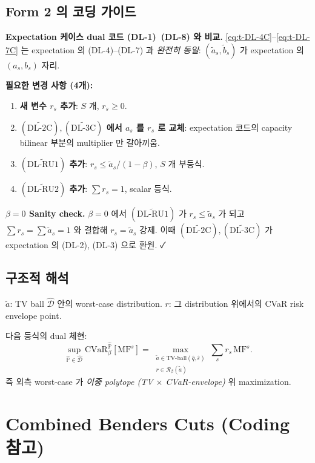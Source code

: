 \documentclass[11pt]{article}
\newcommand{\Phat}{\hat{\mathbb{P}}}
\newcommand{\Dhat}{\hat{\mathcal{D}}}
\newcommand{\hatq}{\hat{q}}
\newcommand{\MF}{\mathrm{MF}}
\newcommand{\CVaR}{\mathrm{CVaR}}
\newcommand{\Rb}{\mathcal{R}_\beta}
\theoremstyle{plain}
\theoremstyle{remark}
\begin{document}
\subsection{Form 2 의 코딩 가이드}

\textbf{Expectation 케이스 dual 코드 (DL-1)~(DL-8) 와 비교.}
\eqref{eq:t-DL-4C}--\eqref{eq:t-DL-7C} 는 expectation 의 (DL-4)--(DL-7) 과 \emph{완전히 동일}:
$(\tilde a_s, \tilde b_s)$ 가 expectation 의 $(a_s, b_s)$ 자리.

\textbf{필요한 변경 사항 (4개):}
\begin{enumerate}[leftmargin=*]
\item \textbf{새 변수 $r_s$ 추가}: $S$ 개, $r_s \geq 0$.
\item \textbf{$(\widetilde{\text{DL-2C}}), (\widetilde{\text{DL-3C}})$ 에서 $a_s$ 를 $r_s$ 로 교체}: expectation 코드의 capacity bilinear 부분의 multiplier 만 갈아끼움.
\item \textbf{$(\widetilde{\text{DL-RU1}})$ 추가}: $r_s \leq \tilde a_s/(1-\beta)$, $S$ 개 부등식.
\item \textbf{$(\widetilde{\text{DL-RU2}})$ 추가}: $\sum r_s = 1$, scalar 등식.
\end{enumerate}

\textbf{$\beta = 0$ Sanity check.} $\beta = 0$ 에서 $(\widetilde{\text{DL-RU1}})$ 가 $r_s \leq \tilde a_s$ 가 되고 $\sum r_s = \sum \tilde a_s = 1$ 와 결합해 $r_s = \tilde a_s$ 강제. 이때 $(\widetilde{\text{DL-2C}}), (\widetilde{\text{DL-3C}})$ 가 expectation 의 (DL-2), (DL-3) 으로 환원. ✓

\subsection{구조적 해석}

\textbf{$\tilde a$}: TV ball $\Dhat$ 안의 worst-case distribution.
\textbf{$r$}: 그 distribution 위에서의 CVaR risk envelope point.

다음 등식의 dual 체현:
\[
\sup_{\Phat \in \Dhat}\CVaR_\beta^{\Phat}[\MF^s] 
= \max_{\substack{\tilde a \in \text{TV-ball}(\hatq, \hat\varepsilon)\\ r \in \Rb(\tilde a)}} \textstyle\sum_s r_s\, \MF^s.
\]
즉 외측 worst-case 가 \emph{이중 polytope (TV $\times$ CVaR-envelope)} 위 maximization.


\section{Combined Benders Cuts (Coding 참고)}
\label{sec:benders-cuts}
\end{document}
